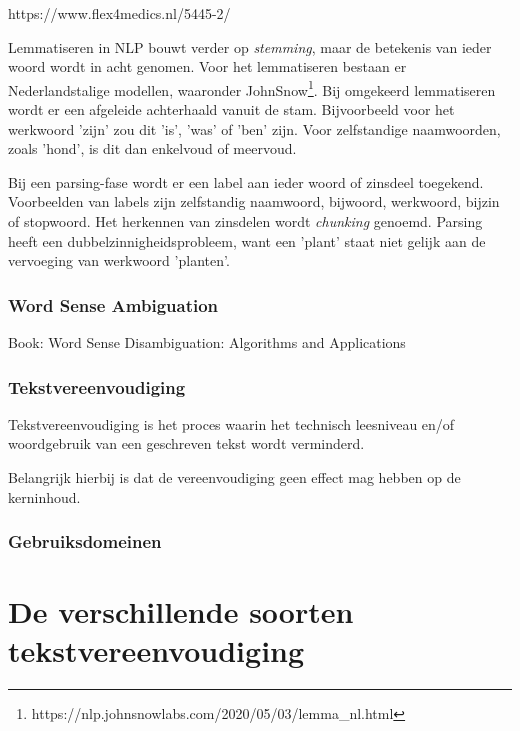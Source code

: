 https://www.flex4medics.nl/5445-2/

Lemmatiseren in NLP bouwt verder op \textit{stemming}, maar de betekenis van ieder woord wordt in acht genomen. Voor het lemmatiseren bestaan er Nederlandstalige modellen, waaronder JohnSnow\footnote{https://nlp.johnsnowlabs.com/2020/05/03/lemma\_nl.html}. Bij omgekeerd lemmatiseren wordt er een afgeleide achterhaald vanuit de stam. Bijvoorbeeld voor het werkwoord 'zijn' zou dit 'is', 'was' of 'ben' zijn. Voor zelfstandige naamwoorden, zoals 'hond', is dit dan enkelvoud of meervoud.

Bij een parsing-fase wordt er een label aan ieder woord of zinsdeel toegekend. Voorbeelden van labels zijn zelfstandig naamwoord, bijwoord, werkwoord, bijzin of stopwoord. Het herkennen van zinsdelen wordt \textit{chunking} genoemd. Parsing heeft een dubbelzinnigheidsprobleem, want een 'plant' staat niet gelijk aan de vervoeging van werkwoord 'planten'. 

\subsubsection{Word Sense Ambiguation}

Book: Word Sense Disambiguation: Algorithms and Applications



\subsubsection{Tekstvereenvoudiging}

Tekstvereenvoudiging is het proces waarin het technisch leesniveau en/of woordgebruik van een geschreven tekst wordt verminderd. 

Belangrijk hierbij is dat de vereenvoudiging geen effect mag hebben op de kerninhoud. 





\subsubsection{Gebruiksdomeinen}

\section{De verschillende soorten tekstvereenvoudiging}

